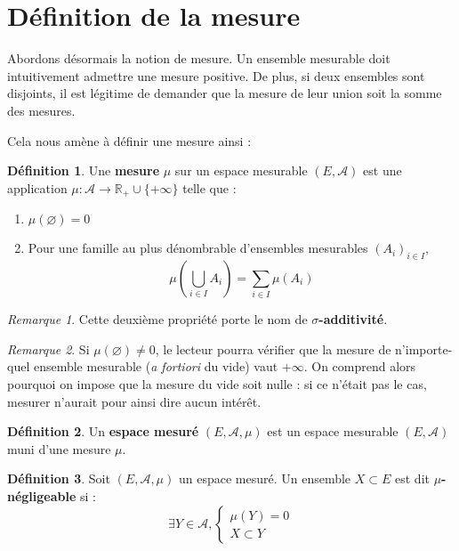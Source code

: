 \documentclass[french]{report}
\theoremstyle{plain}
\theoremstyle{definition}
\newtheorem{defi}{Définition}[section]
\theoremstyle{remark}
\newtheorem{rem}{Remarque}[section]
\begin{document}
\section{Définition de la mesure}

Abordons désormais la notion de mesure.
Un ensemble mesurable doit intuitivement admettre une mesure positive.
De plus, si deux ensembles sont disjoints, il est légitime de demander que la mesure de leur union soit la somme des mesures.

Cela nous amène à définir une mesure ainsi :

\begin{defi}
  Une \textbf{mesure} $\mu$ sur un espace mesurable $(E, \mathcal{A})$ est une application $\mu : \mathcal{A} \longrightarrow \mathbb{R}_+ \cup \{ +\infty \}$ telle que :
  \begin{enumerate}
    \item $\mu(\varnothing) = 0$
    \item Pour une famille au plus dénombrable d'ensembles mesurables $\left(A_i\right)_{i \in I}$,
    $$\mu\left(\bigcup_{i \in I}A_i\right) = \sum_{i \in I} \mu\left(A_i\right)$$
  \end{enumerate}
\end{defi}

\begin{rem}
  Cette deuxième propriété porte le nom de $\sigma$\textbf{-additivité}.
\end{rem}

\begin{rem}
  Si $\mu(\varnothing) \neq 0$, le lecteur pourra vérifier que la mesure de n'importe-quel ensemble mesurable (\textit{a fortiori} du vide) vaut $+\infty$.
  On comprend alors pourquoi on impose que la mesure du vide soit nulle : si ce n'était pas le cas, mesurer n'aurait pour ainsi dire aucun intérêt.
\end{rem}

\begin{defi}
  Un \textbf{espace mesuré} $\left(E, \mathcal{A}, \mu\right)$ est un espace mesurable $\left(E, \mathcal{A}\right)$ muni d'une mesure $\mu$.
\end{defi}

\begin{defi}
  Soit $\left(E, \mathcal{A}, \mu\right)$ un espace mesuré.
  Un ensemble $X \subset E$ est dit $\mu$\textbf{-négligeable} si :
  $$\exists Y \in \mathcal{A}, 
  \left\{
    \begin{array}{c}
      \mu(Y)=0\\
      X \subset Y
    \end{array}
    \right.$$
\end{defi}
\end{document}
